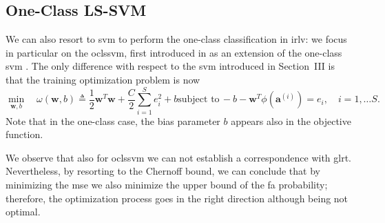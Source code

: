 \documentclass[draftcls,journal,onecolumn]{IEEEtran}
\begin{document}
\subsection{One-Class LS-SVM}

We can also resort to \ac{svm} to perform the one-class classification in \ac{irlv}: we focus in particular on the  \ac{oclssvm}, first introduced in \cite{choi2009} as an extension of the one-class \ac{svm} \cite{Scholkopf2001estimating}. 
The only difference with respect to the \ac{svm} introduced in Section~III is that the training optimization problem is now
\begin{subequations}
	\label{eq:oneClassSvm}
	\begin{equation}
	\label{eq:oneClass1}
	\underset{\bm{w},b}{\min} \quad \omega(\bm{w}, b) \triangleq
	 \frac{1}{2} \bm{w}^T \bm{w} +  \frac{C}{2} \sum_{i=1}^S e_i^2 +b
	\end{equation}
	\begin{equation}
	\label{eq:oneClassConstr}
	\text{subject to}\, -b - \bm{w}^T \phi (\bm{a}^{(i)})  = e_i,  \quad i = 1,\dots S.
	\end{equation}
\end{subequations}
Note that in the one-class case, the bias parameter $b$ appears also in the objective function.


{We observe that also for \ac{oclssvm} we can not establish a correspondence with \ac{glrt}.} Nevertheless, by resorting to the Chernoff bound, we can conclude that by minimizing the \ac{mse} we also minimize the upper bound of the \ac{fa} probability; therefore, the optimization process goes in the right direction although being not optimal.
\end{document}
